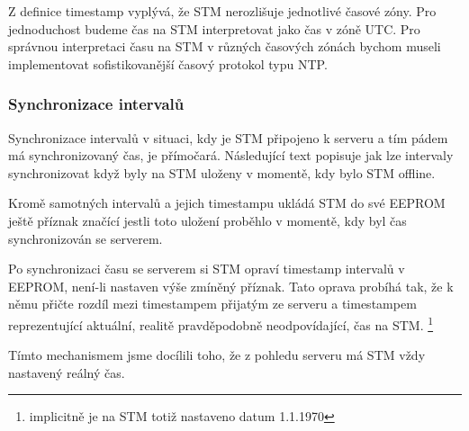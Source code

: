 Z definice timestamp vyplývá, že STM nerozlišuje jednotlivé časové zóny.
Pro jednoduchost budeme čas na STM interpretovat jako čas v zóně UTC.
Pro správnou interpretaci času na STM v různých časových zónách bychom museli implementovat
sofistikovanější časový protokol typu NTP.

\subsubsection{Synchronizace intervalů}
Synchronizace intervalů v situaci, kdy je STM připojeno k serveru a tím pádem má synchronizovaný
čas, je přímočará.
Následující text popisuje jak lze intervaly synchronizovat když byly na STM uloženy v momentě, kdy
bylo STM offline.

Kromě samotných intervalů a jejich timestampu ukládá STM do své EEPROM ještě příznak značící
jestli toto uložení proběhlo v momentě, kdy byl čas synchronizován se serverem.

Po synchronizaci času se serverem si STM opraví timestamp intervalů v EEPROM, není-li nastaven
výše zmíněný příznak.
Tato oprava probíhá tak, že k němu přičte rozdíl mezi timestampem přijatým ze serveru a timestampem
reprezentující aktuální, realitě pravděpodobně neodpovídající, čas na STM.
\footnote{implicitně je na STM totiž nastaveno datum 1.1.1970}

Tímto mechanismem jsme docílili toho, že z pohledu serveru má STM vždy nastavený reálný čas.

